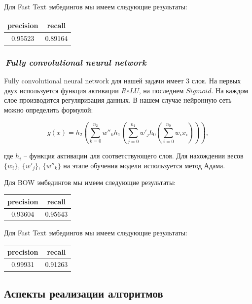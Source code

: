 \documentclass[12pt]{article}
\begin{document}
Для Fast Text эмбедингов мы имеем следующие результаты:
\begin{center}
  \begin{tabular}{ | c | c |}
    \hline
     precision & recall \\ \hline
     0.95523 & 0.89164  \\ \hline
  \end{tabular}
\end{center}

\subsubsection*{\it\,Fully convolutional neural network}

Fully convolutional neural network для нашей задачи имеет 3 слоя. На первых двух используется функция активации $ReLU$, на последнем $Sigmoid$. На каждом слое производится регуляризация данных. В нашем случае нейронную сеть можно определить формулой:

$$
g(x) = h_2 \left(\sum_{k=0}^{n_2} w''_k h_1\left(\sum_{j=0}^{n_1} w'_j h_0\left( \sum_{i=0}^{n_0} w_i x_i \right)\right)\right),
$$

где $h_i$ -- функция активации для соответствующего слоя. Для нахождения весов $\{w_i\}$, $\{w'_j\}$, $\{w''_k\}$ на этапе обучения модели используется метод Адама.

Для BOW эмбедингов мы имеем следующие результаты:
\begin{center}
  \begin{tabular}{ | c | c |}
    \hline
     precision & recall \\ \hline
     0.93604 & 0.95643 \\ \hline
  \end{tabular}
\end{center}

Для Fast Text эмбедингов мы имеем следующие результаты:
\begin{center}
  \begin{tabular}{ | c | c |}
    \hline
     precision & recall \\ \hline
     0.99931 & 0.91263 \\ \hline
  \end{tabular}
\end{center}

\subsection{Аспекты реализации алгоритмов}
\end{document}
